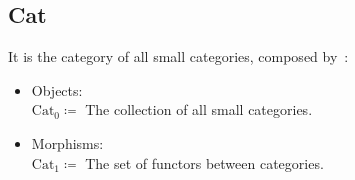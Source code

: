 \subsection{Cat}
\begin{definition}
  It is the category of all small categories, composed
  by~\parencite{adamek_herrlich_strecker:joy_cats}:
  \begin{itemize}
    \item Objects:\\
      $\mathrm{Cat}_0 \coloneqq$ The collection of all small categories.
    \item Morphisms:\\
      $\mathrm{Cat}_1 \coloneqq$ The set of functors between categories.
  \end{itemize}
\end{definition}
